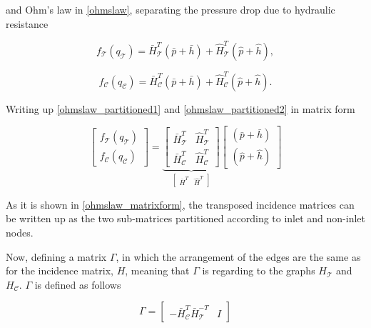 and Ohm's law in \eqref{ohmslaw}, separating the pressure drop due to hydraulic resistance

\begin{equation}
  \label{ohmslaw_partitioned1}
  f_{\mathcal{T}}(q_\mathcal{T}) = \bar{H}^T_{\mathcal{T}} (\bar{p} + \bar{h}) + \hat{H}^T_{\mathcal{T}} (\hat{p} + \hat{h}),
\end{equation}

\begin{equation}
  \label{ohmslaw_partitioned2}
  f_{\mathcal{C}}(q_\mathcal{C}) = \bar{H}^T_{\mathcal{C}} (\bar{p} + \bar{h}) + \hat{H}^T_{\mathcal{C}} (\hat{p} + \hat{h}).
\end{equation}

Writing up \eqref{ohmslaw_partitioned1} and \eqref{ohmslaw_partitioned2} in matrix form

\begin{equation}
\label{ohmslaw_matrixform}
 \begin{bmatrix} 
 f_{\mathcal{T}}(q_\mathcal{T}) \\[3pt]
 f_{\mathcal{C}}(q_\mathcal{C}) 
 \end{bmatrix}
 =
  \underbrace{\begin{bmatrix}
   \bar{H}^T_{\mathcal{T}} & \hat{H}^T_{\mathcal{T}} \\[3pt]
   \bar{H}^T_{\mathcal{C}} & \hat{H}^T_{\mathcal{C}} 
   \end{bmatrix}}_{\begin{bmatrix} 
                  \bar{H}^T & \hat{H}^T 
                  \end{bmatrix}}
   \begin{bmatrix} 
 (\bar{p} + \bar{h}) \\[3pt] 
 (\hat{p} + \hat{h}) 
 \end{bmatrix}
\end{equation}

As it is shown in \eqref{ohmslaw_matrixform}, the transposed incidence matrices can be written up as the two sub-matrices partitioned according to inlet and non-inlet nodes. 

Now, defining a matrix $\Gamma$, in which the arrangement of the edges are the same as for the incidence matrix, $H$, meaning that $\Gamma$ is regarding to the graphs $H_{\mathcal{T}}$ and $H_{\mathcal{C}}$. $\Gamma$ is defined as follows

\begin{equation}
\label{bmatrix}
\Gamma
 =
\begin{bmatrix} 
-\bar{H}^T_{\mathcal{C}}\bar{H}^{-T}_{\mathcal{T}} & I 
\end{bmatrix}
\end{equation}

